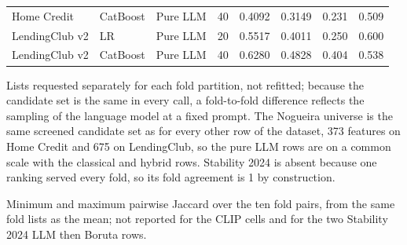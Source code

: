 \documentclass[final,5p,twocolumn]{elsarticle}
\begin{document}
\begin{table}[htbp]
\begin{threeparttable}
\begin{tabular}{@{}lllcrrrr@{}}
Home Credit & CatBoost & Pure LLM & 40 & 0.4092 & 0.3149 & 0.231 & 0.509 \\
LendingClub v2 & LR & Pure LLM & 20 & 0.5517 & 0.4011 & 0.250 & 0.600 \\
LendingClub v2 & CatBoost & Pure LLM & 40 & 0.6280 & 0.4828 & 0.404 & 0.538 \\
\bottomrule
\end{tabular}
\begin{tablenotes}\footnotesize
\item[a] Lists requested separately for each fold partition, not refitted; because the candidate set is the same in every call, a fold-to-fold difference reflects the sampling of the language model at a fixed prompt. The Nogueira universe is the same screened candidate set as for every other row of the dataset, 373 features on Home Credit and 675 on LendingClub, so the pure LLM rows are on a common scale with the classical and hybrid rows. Stability 2024 is absent because one ranking served every fold, so its fold agreement is 1 by construction.
\item[b] Minimum and maximum pairwise Jaccard over the ten fold pairs, from the same fold lists as the mean; not reported for the CLIP cells and for the two Stability 2024 LLM then Boruta rows.
\end{tablenotes}
\end{threeparttable}
\end{table}
\end{document}
